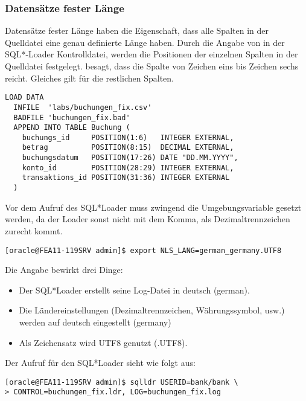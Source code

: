         \subsubsection{Datensätze fester Länge}
          Datensätze fester Länge haben die Eigenschaft, dass alle Spalten in der Quelldatei eine genau definierte Länge haben. Durch die Angabe von  in der SQL*-Loader Kontrolldatei, werden die Positionen der einzelnen Spalten in der Quelldatei festgelegt.  besagt, dass die Spalte  von Zeichen eins bis Zeichen sechs reicht. Gleiches gilt für die restlichen Spalten.
\clearpage
          \begin{lstlisting}[caption={Datensätze fester Länge- Die Kontrolldatei \oscommand{buchungen\_fix.ldr}},label=admin921,language=configfile]
LOAD DATA
  INFILE  'labs/buchungen_fix.csv'
  BADFILE 'buchungen_fix.bad'
  APPEND INTO TABLE Buchung (
    buchungs_id     POSITION(1:6)   INTEGER EXTERNAL,
    betrag          POSITION(8:15)  DECIMAL EXTERNAL,
    buchungsdatum   POSITION(17:26) DATE "DD.MM.YYYY",
    konto_id        POSITION(28:29) INTEGER EXTERNAL,
    transaktions_id POSITION(31:36) INTEGER EXTERNAL
  )
          \end{lstlisting}
          Vor dem Aufruf des SQL*Loader muss zwingend die Umgebungsvariable  gesetzt werden, da der Loader sonst nicht mit dem Komma, als Dezimaltrennzeichen zurecht kommt.
          \begin{lstlisting}[caption={Den SQL*Loader benutzen},label=admin921b,language=expdp_impdp,emph={[9]LOG},emphstyle={[9]\sffamily\color{blue}}]
[oracle@FEA11-119SRV admin]$ export NLS_LANG=german_germany.UTF8
          \end{lstlisting}
          Die Angabe  bewirkt drei Dinge:
          \begin{itemize}
            \item Der SQL*Loader erstellt seine Log-Datei in deutsch (german).
            \item Die Ländereinstellungen (Dezimaltrennzeichen, Währungssymbol, usw.) werden auf deutsch eingestellt (germany)
            \item Als Zeichensatz wird UTF8 genutzt (.UTF8).
          \end{itemize}
          Der Aufruf für den SQL*Loader sieht wie folgt aus:
          \begin{lstlisting}[caption={Den SQL*Loader benutzen},label=admin921a,language=expdp_impdp,emph={[9]LOG},emphstyle={[9]\sffamily\color{blue}}]
[oracle@FEA11-119SRV admin]$ sqlldr USERID=bank/bank \
> CONTROL=buchungen_fix.ldr, LOG=buchungen_fix.log
          \end{lstlisting}
